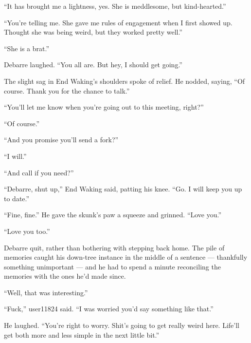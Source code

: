 ``It has brought me a lightness, yes. She is meddlesome, but kind-hearted.''

``You're telling me. She gave me rules of engagement when I first showed up. Thought she was being weird, but they worked pretty well.''

``She is a brat.''

Debarre laughed. ``You all are. But hey, I should get going.''

The slight sag in End Waking's shoulders spoke of relief. He nodded, saying, ``Of course. Thank you for the chance to talk.''

``You'll let me know when you're going out to this meeting, right?''

``Of course.''

``And you promise you'll send a fork?''

``I will.''

``And call if you need?''

``Debarre, shut up,'' End Waking said, patting his knee. ``Go. I will keep you up to date.''

``Fine, fine.'' He gave the skunk's paw a squeeze and grinned. ``Love you.''

``Love you too.''

Debarre quit, rather than bothering with stepping back home. The pile of memories caught his down-tree instance in the middle of a sentence — thankfully something unimportant — and he had to spend a minute reconciling the memories with the ones he'd made since.

``Well, that was interesting.''

``Fuck,'' user11824 said. ``I was worried you'd say something like that.''

He laughed. ``You're right to worry. Shit's going to get really weird here. Life'll get both more and less simple in the next little bit.''
